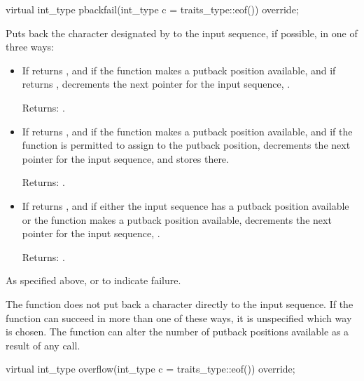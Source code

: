 \begin{itemdecl}
virtual int_type pbackfail(int_type c = traits_type::eof()) override;
\end{itemdecl}

\begin{itemdescr}
\pnum
\effects Puts back the character designated by  to the input sequence, if possible, in one of three ways:

\begin{itemize}
\item
If  returns , and if the function makes a putback position available, and if  returns , decrements the next pointer for the input sequence, .

Returns: .

\item
If  returns , and if the function makes a putback position available, and if the function is permitted to assign to the putback position, decrements the next pointer for the input sequence, and stores  there.

Returns: .

\item
If  returns , and if either the input sequence has a putback position available or the function makes a putback position available, decrements the next pointer for the input sequence, .

Returns: .
\end{itemize}

\pnum
\returns As specified above, or  to indicate failure.

\pnum
\remarks The function does not put back a character directly to the input sequence. If the function can succeed in more than one of these ways, it is unspecified which way is chosen. The function can alter the number of putback positions available as a result of any call.
\end{itemdescr}

\begin{itemdecl}
virtual int_type overflow(int_type c = traits_type::eof()) override;
\end{itemdecl}

